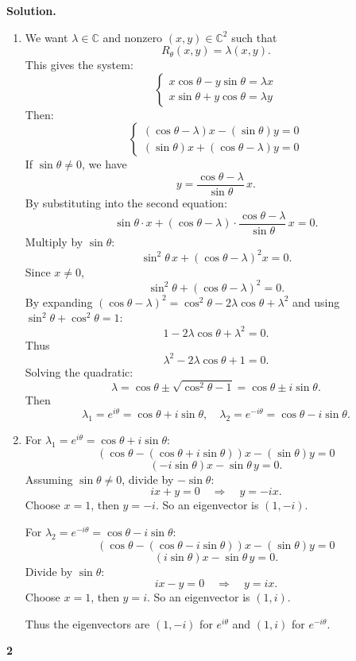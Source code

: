 \documentclass[11pt]{article}
\newcommand{\ProblemDivider}[1]{%
  \vspace{1.0em}
  \noindent\textbf{#1}\par
  \vspace{0.35em}
}
\newcommand{\SolutionAnnounce}{\noindent\textbf{Solution.}\par\medskip}
\newcommand{\C}{\mathbb{C}}
\begin{document}
\begin{solutionBox}
\SolutionAnnounce
\doublespacing

\begin{enumerate}
    \item[(a)] We want \(\lambda \in \C\) and nonzero \((x,y) \in \C^2\) such that
    \[
    R_{\theta}(x,y) = \lambda (x,y).
    \]
    This gives the system:
    \[
    \begin{cases}
        x\cos\theta - y\sin\theta = \lambda x \\[4pt]
        x\sin\theta + y\cos\theta = \lambda y
    \end{cases}
    \]
    Then:
    \[
    \begin{cases}
        (\cos\theta - \lambda)x - (\sin\theta) y = 0 \\[4pt]
        (\sin\theta)x + (\cos\theta - \lambda) y = 0
    \end{cases}
    \]
    If \(\sin\theta \neq 0\), we have
    \[
    y = \frac{\cos\theta - \lambda}{\sin\theta}\, x.
    \]
    By substituting into the second equation:
    \[
    \sin\theta \cdot x + (\cos\theta - \lambda) \cdot \frac{\cos\theta - \lambda}{\sin\theta}\, x = 0.
    \]
    Multiply by \(\sin\theta\):
    \[
    \sin^2\theta\, x + (\cos\theta - \lambda)^2 x = 0.
    \]
    Since \(x \neq 0\),
    \[
    \sin^2\theta + (\cos\theta - \lambda)^2 = 0.
    \]
    By expanding \((\cos\theta - \lambda)^2 = \cos^2\theta - 2\lambda\cos\theta + \lambda^2\) and using \(\sin^2\theta + \cos^2\theta = 1\):
    \[
    1 - 2\lambda\cos\theta + \lambda^2 = 0.
    \]
    Thus
    \[
    \lambda^2 - 2\lambda\cos\theta + 1 = 0.
    \]
    Solving the quadratic:
    \[
    \lambda = \cos\theta \pm \sqrt{\cos^2\theta - 1}
          = \cos\theta \pm i\sin\theta.
    \]
    Then
    \[
    \lambda_1 = e^{i\theta} = \cos\theta + i\sin\theta,\quad
    \lambda_2 = e^{-i\theta} = \cos\theta - i\sin\theta.
    \]

    \item[(b)] For \(\lambda_1 = e^{i\theta} = \cos\theta + i\sin\theta\):
    \[
    (\cos\theta - (\cos\theta + i\sin\theta))x - (\sin\theta) y = 0
    \]
    \[
    (-i\sin\theta)x - \sin\theta\, y = 0.
    \]
    Assuming \(\sin\theta \neq 0\), divide by \(-\sin\theta\):
    \[
    i x + y = 0 \quad\Longrightarrow\quad y = -i x.
    \]
    Choose \(x = 1\), then \(y = -i\). So an eigenvector is \((1, -i)\).

    For \(\lambda_2 = e^{-i\theta} = \cos\theta - i\sin\theta\):
    \[
    (\cos\theta - (\cos\theta - i\sin\theta))x - (\sin\theta) y = 0
    \]
    \[
    (i\sin\theta)x - \sin\theta\, y = 0.
    \]
    Divide by \(\sin\theta\):
    \[
    i x - y = 0 \quad\Longrightarrow\quad y = i x.
    \]
    Choose \(x = 1\), then \(y = i\). So an eigenvector is \((1, i)\).

    Thus the eigenvectors are \((1,-i)\) for \(e^{i\theta}\) and \((1,i)\) for \(e^{-i\theta}\).
\end{enumerate}

\end{solutionBox}
\ProblemDivider{2}
\end{document}
